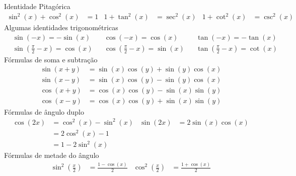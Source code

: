 Identidade Pitagórica
\begin{align*}
  \sin^2(x) + \cos^2(x) & = 1         &
  1 + \tan^2(x)         & = \sec^2(x) &
  1 + \cot^2(x)         & = \csc^2(x)
\end{align*}
Algumas identidades trigonométricas
\begin{align*}
	& \sin(-x)                         = -\sin(x)  &
	& \cos(-x)                         = \cos(x)   &
	& \tan(-x)                         = -\tan(x)  \\[5mm]
	& \sin\left(\frac{\pi}{2}-x\right) = \cos(x)   &
	& \cos\left(\frac{\pi}{2}-x\right) = \sin(x)   &
	& \tan\left(\frac{\pi}{2}-x\right) = \cot(x)
\end{align*}
Fórmulas de soma e subtração
\begin{align*}
	\sin(x+y) & = \sin(x)\cos(y) + \sin(y)\cos(x) \\
	\sin(x-y) & = \sin(x)\cos(y) - \sin(y)\cos(x) \\
	\cos(x+y) & = \cos(x)\cos(y) - \sin(x)\sin(y) \\
	\cos(x-y) & = \cos(x)\cos(y) + \sin(x)\sin(y)
\end{align*}
Fórmulas de ângulo duplo
\begin{align*}
	\cos(2x) & = \cos^2(x) - \sin^2(x) & 	\sin(2x) & = 2\sin(x)\cos(x)  \\
	         & = 2\cos^2(x) - 1        \\
	         & = 1 - 2\sin^2(x)
\end{align*}
Fórmulas de metade do ângulo
\begin{align*}
	\sin^2(\frac{x}{2}) & = \frac{1-\cos(x)}{2} &
  \cos^2(\frac{x}{2}) & = \frac{1+\cos(x)}{2}
\end{align*}

